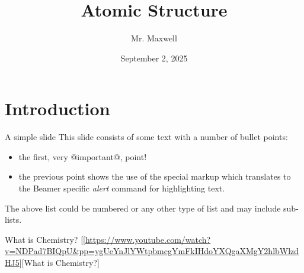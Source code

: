 \documentclass[presentation]{beamer}
\author{Mr. Maxwell}
\date{September 2, 2025}
\title{Atomic Structure}
\begin{document}
\maketitle


\section{Introduction}
\label{sec:org30096a8}
\begin{frame}[label={sec:orgb3b0d47}]{A simple slide}
This slide consists of some text with a number of bullet points:

\begin{itemize}
\item the first, very @important@, point!
\item the previous point shows the use of the special markup which
translates to the Beamer specific \emph{alert} command for highlighting
text.
\end{itemize}


The above list could be numbered or any other type of list and may
include sub-lists.
\end{frame}

\begin{frame}[label={sec:orgc432d71}]{What is Chemistry?}
[[\url{https://www.youtube.com/watch?v=NDPad7BIQpU\&pp=ygUeYnJlYWtpbmcgYmFkIHdoYXQgaXMgY2hlbWlzdHJ5}][What is Chemistry?]
\end{frame}
\end{document}
